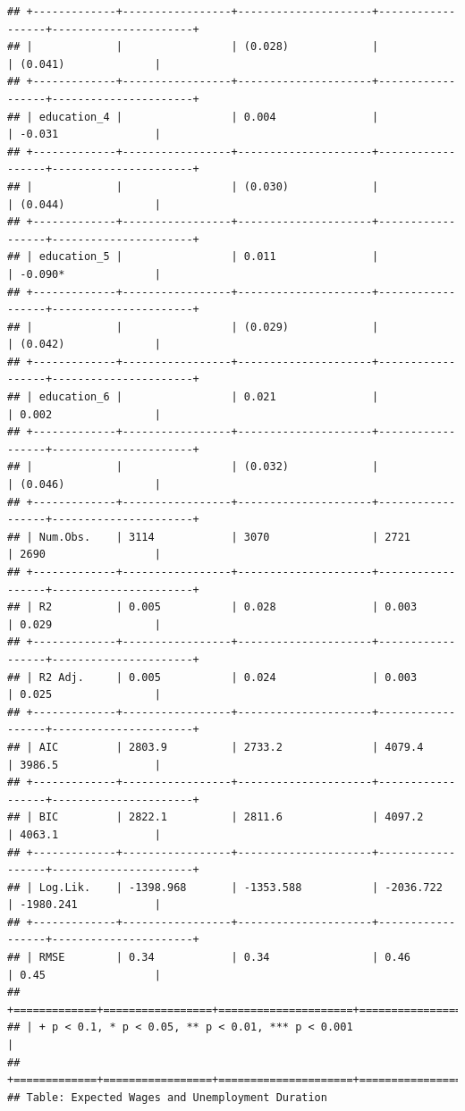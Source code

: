 \documentclass[
]{article}
\begin{document}
\begin{verbatim}
## +-------------+-----------------+---------------------+------------------+----------------------+
## |             |                 | (0.028)             |                  | (0.041)              |
## +-------------+-----------------+---------------------+------------------+----------------------+
## | education_4 |                 | 0.004               |                  | -0.031               |
## +-------------+-----------------+---------------------+------------------+----------------------+
## |             |                 | (0.030)             |                  | (0.044)              |
## +-------------+-----------------+---------------------+------------------+----------------------+
## | education_5 |                 | 0.011               |                  | -0.090*              |
## +-------------+-----------------+---------------------+------------------+----------------------+
## |             |                 | (0.029)             |                  | (0.042)              |
## +-------------+-----------------+---------------------+------------------+----------------------+
## | education_6 |                 | 0.021               |                  | 0.002                |
## +-------------+-----------------+---------------------+------------------+----------------------+
## |             |                 | (0.032)             |                  | (0.046)              |
## +-------------+-----------------+---------------------+------------------+----------------------+
## | Num.Obs.    | 3114            | 3070                | 2721             | 2690                 |
## +-------------+-----------------+---------------------+------------------+----------------------+
## | R2          | 0.005           | 0.028               | 0.003            | 0.029                |
## +-------------+-----------------+---------------------+------------------+----------------------+
## | R2 Adj.     | 0.005           | 0.024               | 0.003            | 0.025                |
## +-------------+-----------------+---------------------+------------------+----------------------+
## | AIC         | 2803.9          | 2733.2              | 4079.4           | 3986.5               |
## +-------------+-----------------+---------------------+------------------+----------------------+
## | BIC         | 2822.1          | 2811.6              | 4097.2           | 4063.1               |
## +-------------+-----------------+---------------------+------------------+----------------------+
## | Log.Lik.    | -1398.968       | -1353.588           | -2036.722        | -1980.241            |
## +-------------+-----------------+---------------------+------------------+----------------------+
## | RMSE        | 0.34            | 0.34                | 0.46             | 0.45                 |
## +=============+=================+=====================+==================+======================+
## | + p < 0.1, * p < 0.05, ** p < 0.01, *** p < 0.001                                             |
## +=============+=================+=====================+==================+======================+
## Table: Expected Wages and Unemployment Duration
\end{verbatim}
\end{document}

